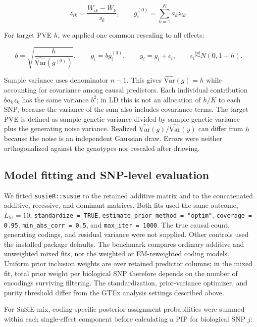 \documentclass[12pt]{article}
\begin{document}
\begin{equation}
z_{ik}=\frac{W_{ik}-\overline{W}_k}{s_k},\qquad
 g_i^{(0)}=\sum_{k=1}^{K}a_k z_{ik}.
\end{equation}

For target PVE $h$, we applied one common rescaling to all effects:

\begin{equation}
b=\sqrt{\frac{h}{\widehat{\mathrm{Var}}(g^{(0)})}},\qquad
 g_i=b g_i^{(0)},\qquad y_i=g_i+\epsilon_i,\qquad
 \epsilon_i\stackrel{\mathrm{iid}}{\sim}N(0,1-h).
\end{equation}

Sample variance uses denominator $n-1$. This gives
$\widehat{\mathrm{Var}}(g)=h$ while accounting for covariance among
causal predictors. Each individual contribution $b a_k z_k$ has the
same variance $b^2$; in LD this is not an allocation of $h/K$ to each
SNP, because the variance of the sum also includes covariance terms.
The target PVE is defined as sample genetic variance divided by sample
genetic variance plus the generating noise variance. Realized
$\widehat{\mathrm{Var}}(g)/\widehat{\mathrm{Var}}(y)$ can differ from
$h$ because the noise is an independent Gaussian draw. Errors were
neither orthogonalized against the genotypes nor rescaled after drawing.

\subsection{Model fitting and SNP-level evaluation}

We fitted \texttt{susieR::susie} to the retained additive matrix and to
the concatenated additive, recessive, and dominant matrices. Both fits
used the same outcome, $L_{\mathrm{fit}}=10$,
\texttt{standardize = TRUE}, \texttt{estimate\_prior\_method = "optim"},
\texttt{coverage = 0.95}, \texttt{min\_abs\_corr = 0.5}, and
\texttt{max\_iter = 1000}. The true causal count, generating codings,
and residual variance were not supplied. Other controls used the
installed package defaults. The benchmark compares ordinary additive
and unweighted mixed fits, not the weighted or EM-reweighted coding
models. Uniform prior inclusion weights are over retained predictor
columns; in the mixed fit, total prior weight per biological SNP
therefore depends on the number of encodings surviving filtering.
The standardization, prior-variance optimizer, and purity threshold
differ from the GTEx analysis settings described above.

For SuSiE-mix, coding-specific posterior assignment probabilities were
summed within each single-effect component before calculating a PIP
for biological SNP $j$:
\end{document}
